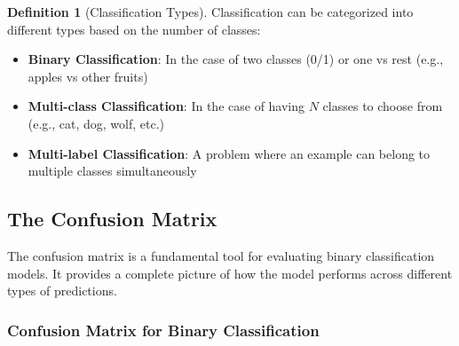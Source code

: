 \documentclass[11pt,a4paper]{article}
\theoremstyle{definition}
\newtheorem{definition}{Definition}[section]
\theoremstyle{plain}
\theoremstyle{remark}
\begin{document}
\begin{definition}[Classification Types]
Classification can be categorized into different types based on the number of classes:

\begin{itemize}
    \item \textbf{Binary Classification}: In the case of two classes (0/1) or one vs rest (e.g., apples vs other fruits)
    
    \item \textbf{Multi-class Classification}: In the case of having $N$ classes to choose from (e.g., cat, dog, wolf, etc.)
    
    \item \textbf{Multi-label Classification}: A problem where an example can belong to multiple classes simultaneously
\end{itemize}
\end{definition}

\subsection{The Confusion Matrix}

The confusion matrix is a fundamental tool for evaluating binary classification models. It provides a complete picture of how the model performs across different types of predictions.

\subsubsection{Confusion Matrix for Binary Classification}
\end{document}
